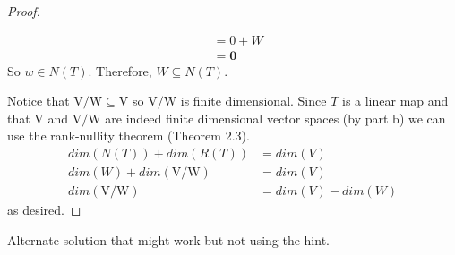 \documentclass[11pt]{scrartcl}
\begin{document}
\begin{enumerate}[label=\alph*.]
{\begin{proof}
\begin{enumerate}[label=\arabic*.]
{\begin{enumerate}[label=\roman*.]
{\begin{align*}
					                       & = 0 + W      \\
					                       & = \mathbf{0}
				                  \end{align*}
				                  }
				                  So $w \in N(T)$. Therefore, $W \subseteq N(T)$.
			            \end{enumerate}
			            }
		      \end{enumerate}
		      Notice that $\mathrm{V}/\mathrm{W} \subseteq \mathrm{V}$
		      so $\mathrm{V}/\mathrm{W}$ is finite dimensional.
		      Since $T$ is a linear map and that $\mathrm{V}$ and $\mathrm{V}/\mathrm{W}$ are indeed finite dimensional vector spaces
		      (by part b) we can use the rank-nullity theorem (Theorem 2.3).
		      \begin{align*}
			      dim(N(T)) + dim(R(T))               & =   dim(V)        \\
			      dim(W) + dim(\mathrm{V}/\mathrm{W}) & = dim(V)          \\
			      dim(\mathrm{V}/\mathrm{W})          & = dim(V) - dim(W)
		      \end{align*}
		      as desired.
	      \end{proof}
	      }

	      \iffalse
		      Alternate solution that might work but not using the hint.


\end{enumerate}
\end{document}
